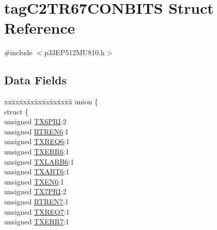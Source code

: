 \hypertarget{structtag_c2_t_r67_c_o_n_b_i_t_s}{}\section{tag\+C2\+T\+R67\+C\+O\+N\+B\+I\+TS Struct Reference}
\label{structtag_c2_t_r67_c_o_n_b_i_t_s}


{\ttfamily \#include $<$p33\+E\+P512\+M\+U810.\+h$>$}

\subsection*{Data Fields}
\begin{DoxyCompactItemize}
\item 
\begin{tabbing}
xx\=xx\=xx\=xx\=xx\=xx\=xx\=xx\=xx\=\kill
union \{\\
\>struct \{\\
\>\>unsigned \hyperlink{structtag_c2_t_r67_c_o_n_b_i_t_s_acf0204ed7c7f2365b8630fad0bd6eb47}{TX6PRI}:2\\
\>\>unsigned \hyperlink{structtag_c2_t_r67_c_o_n_b_i_t_s_a555ea6fcaef37752e28a0a6d3f23a38f}{RTREN6}:1\\
\>\>unsigned \hyperlink{structtag_c2_t_r67_c_o_n_b_i_t_s_a2c5aa76d2ac34727d2c3b1242fde4597}{TXREQ6}:1\\
\>\>unsigned \hyperlink{structtag_c2_t_r67_c_o_n_b_i_t_s_a746ded28bbd2c1c42e066da844e4774d}{TXERR6}:1\\
\>\>unsigned \hyperlink{structtag_c2_t_r67_c_o_n_b_i_t_s_a29a390fc526dca0108230724c93377ba}{TXLARB6}:1\\
\>\>unsigned \hyperlink{structtag_c2_t_r67_c_o_n_b_i_t_s_a37dcf845d3570c5a496ee239ed4ba635}{TXABT6}:1\\
\>\>unsigned \hyperlink{structtag_c2_t_r67_c_o_n_b_i_t_s_ae9e23626a2fc83756bd209c1222e8f83}{TXEN6}:1\\
\>\>unsigned \hyperlink{structtag_c2_t_r67_c_o_n_b_i_t_s_a24fbd8b8aa9cf8b109b5ac2a2d602d35}{TX7PRI}:2\\
\>\>unsigned \hyperlink{structtag_c2_t_r67_c_o_n_b_i_t_s_a5f2b9fb0769e595dcddbf1f6ebe55592}{RTREN7}:1\\
\>\>unsigned \hyperlink{structtag_c2_t_r67_c_o_n_b_i_t_s_a787fc1af7ad34091400347d5ff70bd22}{TXREQ7}:1\\
\>\>unsigned \hyperlink{structtag_c2_t_r67_c_o_n_b_i_t_s_a238a79af6c23622b547fe5ff3eeca61f}{TXERR7}:1\\

\end{tabbing}
\end{DoxyCompactItemize}
